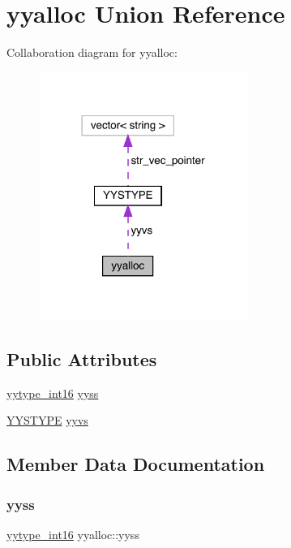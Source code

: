 \hypertarget{unionyyalloc}{}\section{yyalloc Union Reference}
\label{unionyyalloc}


Collaboration diagram for yyalloc\+:
\nopagebreak
\begin{figure}[H]
\begin{center}
\leavevmode
\includegraphics[width=194pt]{unionyyalloc__coll__graph}
\end{center}
\end{figure}
\subsection*{Public Attributes}
\begin{DoxyCompactItemize}
\item 
\mbox{\hyperlink{uppaalparser_8cpp_ade5b97f0021a4f6c5922ead3744ab297}{yytype\+\_\+int16}} \mbox{\hyperlink{unionyyalloc_aad44e4a724037e32eeb58333c516bb45}{yyss}}
\item 
\mbox{\hyperlink{union_y_y_s_t_y_p_e}{Y\+Y\+S\+T\+Y\+PE}} \mbox{\hyperlink{unionyyalloc_a9494cc8d8cd0eba1b44ca20fe89de5d2}{yyvs}}
\end{DoxyCompactItemize}


\subsection{Member Data Documentation}
\mbox{\label{unionyyalloc_aad44e4a724037e32eeb58333c516bb45}} 
\subsubsection{\texorpdfstring{yyss}{yyss}}
{\footnotesize\ttfamily \mbox{\hyperlink{uppaalparser_8cpp_ade5b97f0021a4f6c5922ead3744ab297}{yytype\+\_\+int16}} yyalloc\+::yyss}

